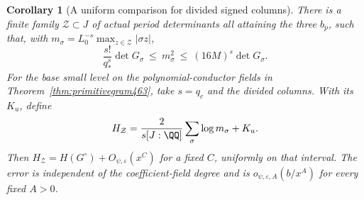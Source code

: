 \documentclass[a4paper,11pt]{article}
\newtheorem{corollary}[proposition]{Corollary}
\theoremstyle{definition}
\theoremstyle{remark}
\numberwithin{equation}{section}
\begin{document}
\begin{corollary}[A uniform comparison for divided signed columns]\leavevmode
\label{cor:markedheight477}
There is a finite family \(\mathcal Z\subset J\) of actual period
determinants all attaining the three \(b_p\), such that, with
\(m_\sigma=L_0^{-s}\max_{z\in\mathcal Z}|\sigma z|\),
\[
            \frac{s!}{q_*^s}\det G_\sigma
              \ \le\ m_\sigma^2
              \ \le\ (16M)^s\det G_\sigma .
\]
For the base small level on the polynomial-conductor fields in
Theorem~\ref{thm:primitivegram463}, take \(s=q_c\) and the divided
columns. With its \(K_u\), define
\[
       H_{\mathcal Z}=
         \frac{2}{s[J:\QQ]}\sum_\sigma\log m_\sigma+K_u .
\]
Then \(H_{\mathcal Z}=H(G^\circ)+O_{\psi,\varepsilon}(x^C)\)
for a fixed \(C\), uniformly on that interval. The error is
independent of the coefficient-field degree and is
\(o_{\psi,\varepsilon,A}(b/x^A)\) for every fixed \(A>0\).
\end{corollary}
\end{document}
